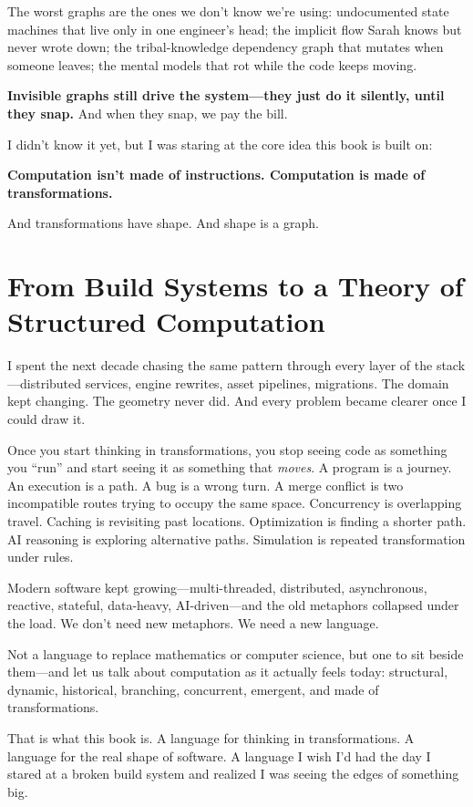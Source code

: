 The worst graphs are the ones we don't know we're using: undocumented state machines that live only in one engineer's head; the implicit flow Sarah knows but never wrote down; the tribal-knowledge dependency graph that mutates when someone leaves; the mental models that rot while the code keeps moving.

\textbf{Invisible graphs still drive the system—they just do it silently, until they snap.}  
And when they snap, we pay the bill.

I didn't know it yet, but I was staring at the core idea this book is built on:

\textbf{Computation isn't made of instructions. Computation is made of transformations.}

And transformations have shape. And shape is a graph.

\section{From Build Systems to a Theory of Structured Computation}
\label{sec:theory-of-everything}

I spent the next decade chasing the same pattern through every layer of the stack—distributed services, engine rewrites, asset pipelines, migrations. The domain kept changing. The geometry never did. And every problem became clearer once I could draw it.

Once you start thinking in transformations, you stop seeing code as something you ``run'' and start seeing it as something that \textit{moves}. A program is a journey. An execution is a path. A bug is a wrong turn. A merge conflict is two incompatible routes trying to occupy the same space. Concurrency is overlapping travel. Caching is revisiting past locations. Optimization is finding a shorter path. AI reasoning is exploring alternative paths. Simulation is repeated transformation under rules.

Modern software kept growing—multi-threaded, distributed, asynchronous, reactive, stateful, data-heavy, AI-driven—and the old metaphors collapsed under the load. We don’t need new metaphors. We need a new language.

Not a language to replace mathematics or computer science, but one to sit beside them—and let us talk about computation as it actually feels today: structural, dynamic, historical, branching, concurrent, emergent, and made of transformations.

That is what this book is. A language for thinking in transformations. A language for the real shape of software. A language I wish I'd had the day I stared at a broken build system and realized I was seeing the edges of something big.

